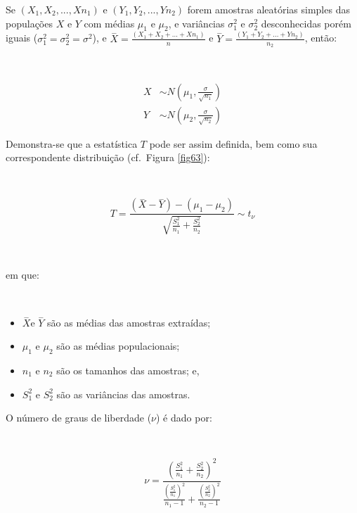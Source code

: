\documentclass[
]{book}
\providecommand{\tightlist}{%
  \setlength{\itemsep}{0pt}\setlength{\parskip}{0pt}}
\begin{document}
\hfill\break

Se \((X_{1}, X_{2},...,X{n_{1}})\) e \((Y_{1}, Y_{2},...,Y{n_{2}})\) forem amostras aleatórias simples das populações \(X\) e \(Y\) com médias \(\mu_{1}\) e \(\mu_{2}\), e variâncias \(\sigma_{1}^{2}\) e \(\sigma_{2}^{2}\) desconhecidas porém iguais (\(\sigma_{1}^{2}=\sigma_{2}^{2}=\sigma^{2}\)), e \(\stackrel{-}{X}=\frac{(X_{1}+X_{2}+...+X{n_{1}})}{n}\) e \(\stackrel{-}{Y}=\frac{(Y_{1}+Y_{2}+...+Y{n_{2}})}{n_{2}}\), então:

~

\begin{align*}
{X} &  \sim N( \mu_{1} ,  \frac{\sigma}{\sqrt{n_{1}}} ) \\
{Y} & \sim N( \mu_{2} ,  \frac{\sigma}{\sqrt{n_{2}}} )
\end{align*}

\hfill\break

Demonstra-se que a estatística \(T\) pode ser assim definida, bem como sua correspondente distribuição (cf.~Figura \ref{fig63}):

~

\[
T = \frac{   (\stackrel{-}{X}-\stackrel{-}{Y})   - (\mu_{1}-\mu_{2})}{
\sqrt{\frac{S^{2}_{1}}{n_{1}} + \frac{S^{2}_{2}}{n_{2}}}}  \sim t_{\nu}
\]

~

em que:

~

\begin{itemize}
\tightlist
\item
  \(\stackrel{-}{X}\)e \(\stackrel{-}{Y}\) são as médias das amostras extraídas;
\item
  \(\mu_{1}\) e \(\mu_{2}\) são as médias populacionais;\\
\item
  \(n_{1}\) e \(n_{2}\) são os tamanhos das amostras; e,
\item
  \(S_{1}^{2}\) e \(S_{2}^{2}\) são as variâncias das amostras.
\end{itemize}

\hfill\break

O número de graus de liberdade (\(\nu\)) é dado por:

~

\[
\nu = \frac{
(\frac{S^{2}_{1}}{n_{1}} +
\frac{S^{2}_{2}}{n_{2}})^{2}
}
{ 
\frac{(\frac{S^{2}_{1}}{n_{1}})^{2}}{n_{1}-1}  +
\frac{(\frac{S^{2}_{2}}{n_{2}})^{2}}{n_{2}-1}
}
\]

\hfill\break
\end{document}
